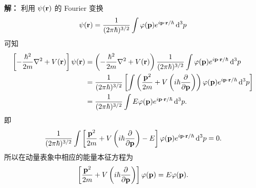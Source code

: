 \documentclass[10pt,a4paper]{article}
\begin{document}
\noindent\textbf{解：}
利用 $\psi(\vb{r})$ 的 Fourier 变换
\[
\psi(\vb{r})=\frac{1}{(2\pi\hbar)^{3/2}}\int \varphi(\vb{p})e^{i\vb{p}\cdot \vb{r}/\hbar}\, \dd^3 p
\]
可知
\begin{align*}
  \left[-\frac{\hbar^2}{2m}\nabla^2 + V(\vb{r})\right]\psi(\vb{r})
  &= \left(-\frac{\hbar^2}{2m}\nabla^2 + V(\vb{r})\right)
  \frac{1}{(2\pi\hbar)^{3/2}}\int \varphi(\vb{p})e^{i\vb{p}\cdot\vb{r}/\hbar}\, \dd^3p \\
  &= \frac{1}{(2\pi\hbar)^{3/2}}\left[\int \left(\frac{\vb{p}^2}{2m} + V\left(i\hbar\pdv{}{\vb{p}}\right)\right)
  \varphi(\vb{p})e^{i\vb{p}\cdot\vb{r}/\hbar}\, \dd^3p\right]\\
  &= \frac{1}{(2\pi\hbar)^{3/2}}\int E\varphi(\vb{p})e^{i\vb{p}\cdot\vb{r}/\hbar}\, \dd^3p.
\end{align*}
即
\[
\frac{1}{(2\pi\hbar)^{3/2}}
\int \left[\frac{\vb{p}^2}{2m}+V\left(i\hbar\pdv{}{\vb{p}}\right)-E\right]
\varphi(\vb{p})e^{i\vb{p}\cdot\vb{r}/\hbar}\, \dd^3p = 0.
\]
所以在动量表象中相应的能量本征方程为
\[
\left[\frac{\vb{p}^2}{2m}+V\left(i\hbar\pdv{}{\vb{p}}\right)\right]\varphi(\vb{p})=E\varphi(\vb{p}).
\]


\end{document}
